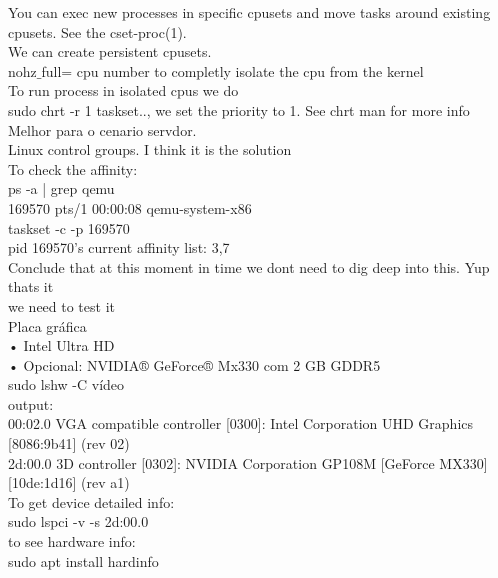 \documentclass[11pt, a4paper, oneside]{article}
\theoremstyle{definition}
\begin{document}
You can exec new processes in specific cpusets and move tasks around existing cpusets. See the cset-proc(1).\\
We can create persistent cpusets.\\

nohz$\_$full= cpu number to completly isolate the cpu from the kernel\\

To run process in isolated cpus we do \\
sudo chrt -r 1 taskset.., we set the priority to 1. See chrt man for more info\\

Melhor para o cenario servdor.\\

Linux control groups. I think it is the solution\\

To check the affinity:\\
ps -a | grep qemu\\
 	169570 pts/1    00:00:08 qemu-system-x86\\
taskset -c -p 169570\\
	pid 169570's current affinity list: 3,7\\


Conclude that at this moment in time we dont need to dig deep into this. Yup thats it\\
we need to test it\\

Placa gráfica\\
    • Intel Ultra HD \\
    • Opcional: NVIDIA® GeForce® Mx330 com 2 GB GDDR5 \\

sudo lshw -C vídeo\\

output:\\
00:02.0 VGA compatible controller [0300]: Intel Corporation UHD Graphics [8086:9b41] (rev 02)\\

2d:00.0 3D controller [0302]: NVIDIA Corporation GP108M [GeForce MX330] [10de:1d16] (rev a1)\\


To get device detailed info:\\
sudo lspci -v -s 2d:00.0\\

to see hardware info:\\
sudo apt install hardinfo\\
\end{document}
